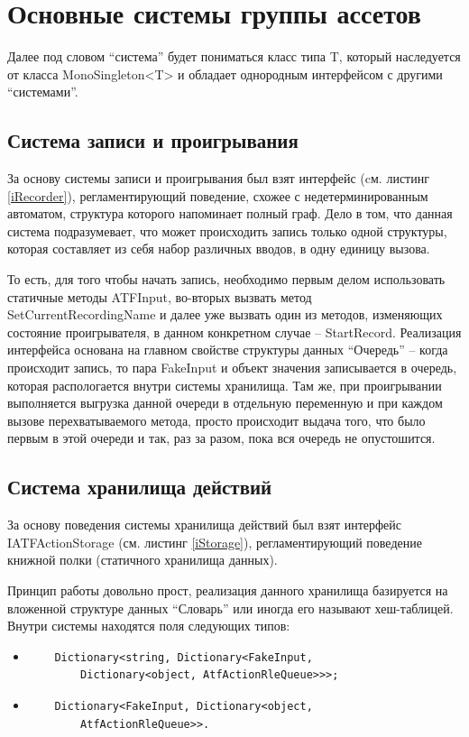 \section{Основные системы группы ассетов}
Далее под словом ``система'' будет пониматься класс типа T, который наследуется от класса MonoSingleton<T> и обладает однородным интерфейсом с другими ``системами''.

\subsection{Система записи и проигрывания}
За основу системы записи и проигрывания был взят интерфейс (cм. листинг \ref{iRecorder}), регламентирующий поведение, схожее с недетерминированным автоматом, структура которого напоминает полный граф. Дело в том, что данная система подразумевает, что может происходить запись только одной структуры, которая составляет из себя набор различных вводов, в одну единицу вызова.

То есть, для того чтобы начать запись, необходимо первым делом использовать статичные методы ATFInput, во-вторых вызвать метод SetCurrentRecordingName и далее уже вызвать один из методов, изменяющих состояние проигрывателя, в данном конкретном случае -- StartRecord. Реализация интерфейса основана на главном свойстве структуры данных ``Очередь'' -- когда происходит запись, то пара FakeInput и объект значения записывается в очередь, которая распологается внутри системы хранилища. Там же, при проигрывании выполняется выгрузка данной очереди в отдельную переменную и при каждом вызове перехватываемого метода, просто происходит выдача того, что было первым в этой очереди и так, раз за разом, пока вся очередь не опустошится.

\subsection{Система хранилища действий}
За основу поведения системы хранилища действий был взят интерфейс IATFActionStorage (см. листинг \ref{iStorage}), регламентирующий поведение книжной полки (статичного хранилища данных).

Принцип работы довольно прост, реализация данного хранилища базируется на вложенной структуре данных ``Словарь'' или иногда его называют хеш-таблицей. Внутри системы находятся поля следующих типов:
\begin{itemize}
	\item 
	\begin{verbatim}
	Dictionary<string, Dictionary<FakeInput, 
		Dictionary<object, AtfActionRleQueue>>>;
	\end{verbatim}
	\item 
	\begin{verbatim}
	Dictionary<FakeInput, Dictionary<object, 
		AtfActionRleQueue>>.
	\end{verbatim}
\end{itemize}

